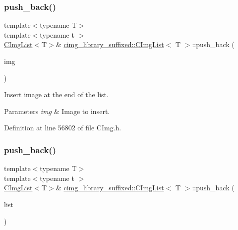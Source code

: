 \subsubsection{\texorpdfstring{push\+\_\+back()}{push\_back()}\hspace{0.1cm}{\footnotesize\ttfamily [1/2]}}
{\footnotesize\ttfamily template$<$typename T$>$ \\
template$<$typename t $>$ \\
\hyperlink{structcimg__library__suffixed_1_1CImgList}{C\+Img\+List}$<$T$>$\& \hyperlink{structcimg__library__suffixed_1_1CImgList}{cimg\+\_\+library\+\_\+suffixed\+::\+C\+Img\+List}$<$ T $>$\+::push\+\_\+back (\begin{DoxyParamCaption}\item[{const \hyperlink{structcimg__library__suffixed_1_1CImg}{C\+Img}$<$ t $>$ \&}]{img }\end{DoxyParamCaption})\hspace{0.3cm}{\ttfamily [inline]}}



Insert image at the end of the list. 


\begin{DoxyParams}{Parameters}
{\em img} & Image to insert. \\
\hline
\end{DoxyParams}


Definition at line 56802 of file C\+Img.\+h.

\mbox{\label{structcimg__library__suffixed_1_1CImgList_a1ea56fb5e0860f360b3ccfce50ae71e0}} 
\subsubsection{\texorpdfstring{push\+\_\+back()}{push\_back()}\hspace{0.1cm}{\footnotesize\ttfamily [2/2]}}
{\footnotesize\ttfamily template$<$typename T$>$ \\
template$<$typename t $>$ \\
\hyperlink{structcimg__library__suffixed_1_1CImgList}{C\+Img\+List}$<$T$>$\& \hyperlink{structcimg__library__suffixed_1_1CImgList}{cimg\+\_\+library\+\_\+suffixed\+::\+C\+Img\+List}$<$ T $>$\+::push\+\_\+back (\begin{DoxyParamCaption}\item[{const \hyperlink{structcimg__library__suffixed_1_1CImgList}{C\+Img\+List}$<$ t $>$ \&}]{list }\end{DoxyParamCaption})\hspace{0.3cm}{\ttfamily [inline]}}



